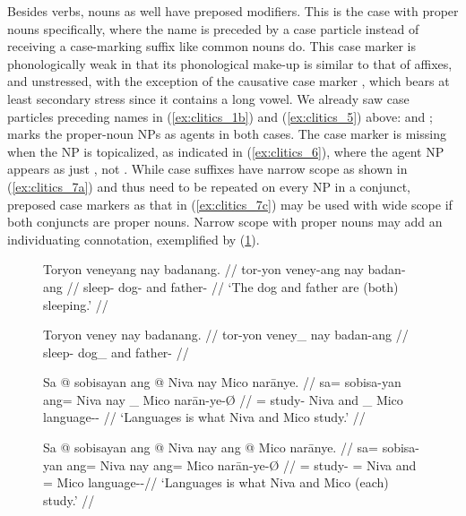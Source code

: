 \label{clitics_prenoun_case}
Besides verbs, nouns as well have preposed modifiers. This is the
case with proper nouns specifically, where the name is preceded by a case
particle instead of receiving a case-marking suffix like common nouns do. This
case marker is phonologically weak in that its phonological make-up is similar
to that of affixes, and unstressed, with the exception of the causative case
marker , which bears at least secondary stress since it contains
a long vowel. We already saw case particles preceding names in
(\ref{ex:clitics_1b}) and (\ref{ex:clitics_5}) above:  and ;  marks the proper-noun NPs
as agents in both cases. The case marker is missing when the NP is topicalized,
as indicated in (\ref{ex:clitics_6}), where the agent NP appears as just
, not . While case suffixes have narrow
scope as shown in (\ref{ex:clitics_7a}) and thus need to be repeated on every
NP in a conjunct, preposed case markers as that in (\ref{ex:clitics_7c}) may be
used with wide scope if both conjuncts are proper nouns. Narrow scope with
proper nouns may add an individuating connotation, exemplified by
(\ref{ex:clitics_7d}).

\begin{figure}[h]
\pex\label{ex:clitics_7}
\a\label{ex:clitics_7a}\begingl
	\gla Toryon veneyang nay badanang. //
	\glb tor-yon veney-ang nay badan-ang //
	\glc sleep-\TplN{} dog-\Aarg{} and father-\Aarg{} //
	\glft `The dog and father are (both) sleeping.' //
\endgl

\a\label{ex:clitics_7b}\ljudge{*}\begingl
	\gla Toryon veney nay badanang. //
	\glb tor-yon veney\_ nay badan-ang //
	\glc sleep-\TplN{} dog\_ and father-\Aarg{} //
\endgl

\a\label{ex:clitics_7c}\begingl
	\gla Sa @ sobisayan ang @ Niva nay {} Mico narānye. //
	\glb sa= sobisa-yan ang= Niva nay \_ Mico narān-ye-Ø //
	\glc \PatT{}= study-\TplM{} \Aarg{} Niva and \_ Mico 
		language-\Pl{}-\Top{} //
	\glft `Languages is what Niva and Mico study.' //
\endgl

\a\label{ex:clitics_7d}\begingl
	\gla Sa @ sobisayan ang @ Niva nay ang @ Mico narānye. //
	\glb sa= sobisa-yan ang= Niva nay ang= Mico narān-ye-Ø //
	\glc \PatT{}= study-\TplM{} \Aarg{}= Niva and \Aarg{}= Mico 
		language-\Pl{}-\Top{}//
	\glft `Languages is what Niva and Mico (each) study.' //
\endgl
\xe
\end{figure}

